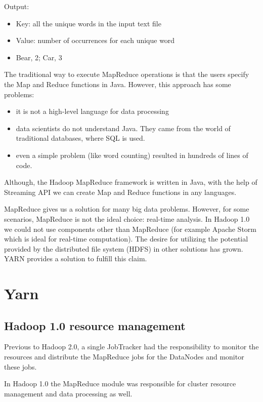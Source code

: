 \noindent Output:
\begin{itemize}
	\item Key: all the unique words in the input text file
	\item Value: number of occurrences for each unique word
	\item \eg  Bear, 2; Car, 3
\end{itemize}

The traditional way to execute MapReduce operations is that the users specify the Map and Reduce functions in Java. However, this approach has some problems:
\begin{itemize}
	\item it is not a high-level language for data processing
	\item data scientists do not understand Java. They came from the world of traditional databases, where SQL is used.
	\item even a simple problem (like word counting) resulted in hundreds of lines of code.
\end{itemize}

Although, the Hadoop MapReduce framework is written in Java, with the help of Streaming API we can create Map and Reduce functions in any languages.

MapReduce gives us a solution for many big data problems. However, for some scenarios, MapReduce is not the ideal choice: \eg real-time analysis. In Hadoop 1.0 we could not use components other than MapReduce (for example Apache Storm which is ideal for real-time computation). The desire for utilizing the potential provided by the distributed file system (HDFS) in other solutions has grown. YARN provides a solution to fulfill this claim. \section{Yarn \cite{YARN}}
\subsection{Hadoop 1.0 resource management}
Previous to Hadoop 2.0, a single JobTracker had the responsibility to monitor the resources and distribute the MapReduce jobs for the DataNodes and monitor these jobs. 

In Hadoop 1.0 the MapReduce module was responsible for cluster resource management and data processing as well.

